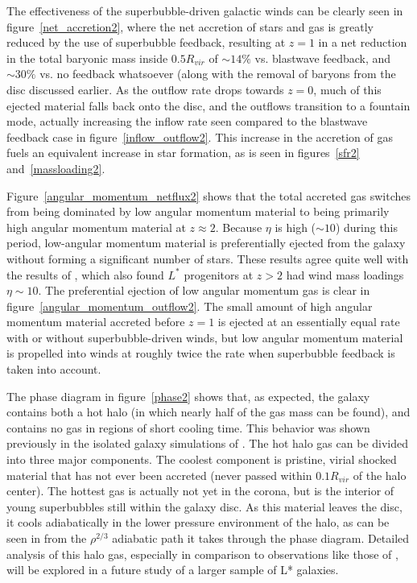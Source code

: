 The effectiveness of the superbubble-driven galactic winds can be clearly seen
in figure~\ref{net_accretion2}, where the net accretion of stars and gas is
greatly reduced by the use of superbubble feedback, resulting at $z=1$ in a net
reduction in the total baryonic mass inside $0.5R_{vir}$ of $\sim14\%$ vs.
blastwave feedback, and $\sim30\%$ vs. no feedback whatsoever (along with the 
removal of baryons from the disc discussed earlier. As the outflow
rate drops towards $z=0$, much of this ejected material falls back onto the
disc, and the outflows transition to a fountain mode, actually increasing
the inflow rate seen compared to the blastwave feedback case in
figure~\ref{inflow_outflow2}.  This increase in the accretion of gas fuels an
equivalent increase in star formation, as is seen in figures~\ref{sfr2}
and~\ref{massloading2}.

Figure~\ref{angular_momentum_netflux2} shows that the total accreted gas switches
from being dominated by low angular momentum material to being primarily high
angular momentum material at $z\approx2$.  Because $\eta$ is high ($\sim 10$)
during this period, low-angular momentum material is preferentially ejected from
the galaxy without forming a significant number of stars.  These results agree
quite well with the results of \citet{Muratov2015}, which also found $L^*$
progenitors at $z>2$ had wind mass loadings $\eta\sim 10$. The preferential
ejection of low angular momentum gas is clear in
figure~\ref{angular_momentum_outflow2}.  The small amount of high angular
momentum material accreted before $z=1$ is ejected at an essentially equal rate
with or without superbubble-driven winds, but low angular momentum material is
propelled into winds at roughly twice the rate when superbubble feedback is
taken into account.

The phase diagram in figure~\ref{phase2} shows that, as expected, the galaxy
contains both a hot halo (in which nearly half of the gas mass can be found),
and contains no gas in regions of short cooling time.  This behavior was shown
previously in the isolated galaxy simulations of \citet{Keller2014}.  The hot
halo gas can be divided into three major components. The coolest component is
pristine, virial shocked material that has not ever been accreted (never passed
within $0.1R_{vir}$ of the halo center).  The hottest gas is actually not yet in
the corona, but is the interior of young superbubbles still within the galaxy
disc.  As this material leaves the disc, it cools adiabatically in the lower
pressure environment of the halo, as can be seen in from the $\rho^{2/3}$
adiabatic path it takes through the phase diagram.  Detailed analysis of this
halo gas, especially in comparison to observations like those of
\citet{Steidel2010}, will be explored in a future study of a larger sample of
L* galaxies.

